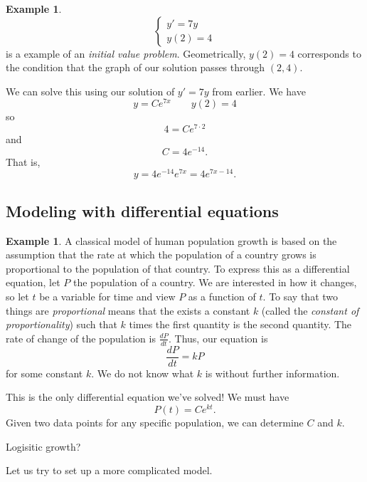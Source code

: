 \documentclass[12pt]{amsart}
\numberwithin{equation}{section}
\theoremstyle{plain} %
\theoremstyle{definition}
\newtheorem{ex}[equation]{Example}
\theoremstyle{remark}
\begin{document}
\begin{ex}\label{ex:first IVP}
\[\begin{cases} y' = 7y \\ 
y(2)=4 \end{cases}\]
is a example of an \emph{initial value problem}. Geometrically, $y(2)=4$ corresponds to the condition that the graph of our solution passes through $(2,4)$.


We can solve this using our solution of $y'=7y$ from earlier. We have
\[ y= Ce^{7x} \qquad y(2)=4\]
so \[ 4 = C e^{7 \cdot 2}\]
and \[ C= 4e^{-14}.\]
That is,
\[ y= 4e^{-14}e^{7x} = 4 e^{7x-14}.\]
\end{ex}



\subsection*{Modeling with differential equations}


\begin{ex} A classical model of human population growth is based on the assumption that the rate at which the population of a country grows is proportional to the population of that country. To express this as a differential equation, let $P$ the population of a country. We are interested in how it changes, so let $t$ be a variable for time and view $P$ as a function of $t$.  To say that two things are \emph{proportional} means that the exists a constant $k$ (called the \emph{constant of proportionality}) such that $k$ times the first quantity is the second quantity. The rate of change of the population is $\frac{dP}{dt}$. Thus, our equation is
\[ \frac{dP}{dt} = kP \]
for some constant $k$. We do not know what $k$ is without further information.

This is the only differential equation we've solved! We must have 
\[ P(t) = C e^{kt}.\]
Given two data points for any specific population, we can determine $C$ and $k$.
\end{ex}

Logisitic growth?


Let us try to set up a more complicated model.
\end{document}
